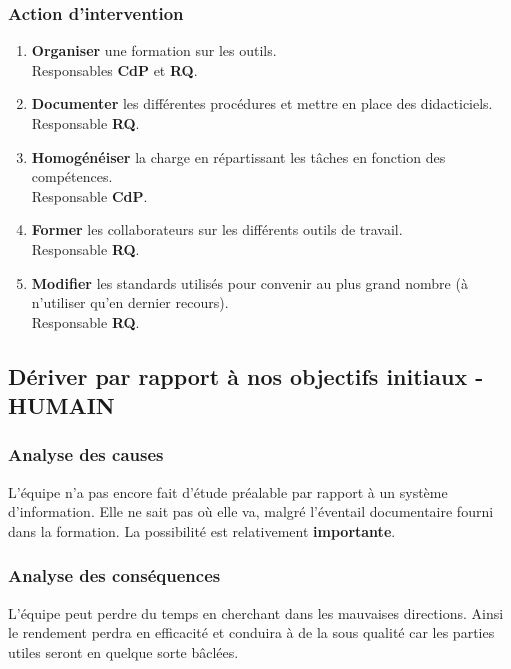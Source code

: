 \subsubsection{Action d'intervention}

\begin{enumerate}
\item {\bf Organiser} une formation sur les outils.\\
Responsables {\bf CdP} et {\bf RQ}.
\item {\bf Documenter} les différentes procédures et mettre en place des
didacticiels.\\
Responsable {\bf RQ}.
\item {\bf Homogénéiser} la charge en répartissant les tâches en fonction
des compétences. \\
Responsable {\bf CdP}.
\item {\bf Former} les collaborateurs sur les différents outils de travail. \\
Responsable {\bf RQ}.
\item {\bf Modifier} les standards utilisés pour convenir au plus grand nombre
(à n'utiliser qu'en dernier recours). \\Responsable {\bf RQ}.
\end{enumerate}

\subsection{Dériver par rapport à nos objectifs initiaux - HUMAIN}
\subsubsection{Analyse des causes}

L'équipe n'a pas encore fait d'étude préalable par rapport à un système
d'information. Elle ne sait pas où elle va, malgré l'éventail documentaire
fourni dans la formation. 
La possibilité est relativement {\bf importante}.

\subsubsection{Analyse des conséquences}

L'équipe peut perdre du temps en cherchant dans les mauvaises directions.
Ainsi le rendement perdra en efficacité et conduira à de la sous qualité car
les parties utiles seront en quelque sorte bâclées. 

